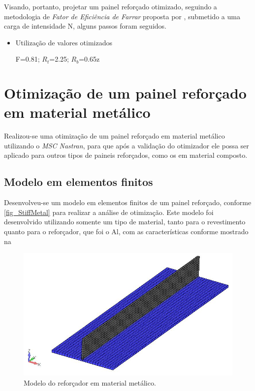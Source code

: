 {Visando, portanto, projetar um painel reforçado otimizado, seguindo a metodologia de \emph{Fator de Eficiência de Farrar} proposta por \cite{niu1997airframe}, submetido a uma carga de intensidade N, alguns passos foram seguidos.

\begin{itemize}
\item Utilização de valores otimizados \

F=0.81; $R_t$=2.25; $R_b$=0.65z\

\end{itemize}

\section{Otimização de um painel reforçado em material metálico}
Realizou-se uma otimização de um painel reforçado em material metálico utilizando o \emph{MSC Nastran}, para que após a validação do otimizador ele possa ser aplicado para outros tipos de paineis reforçados, como os em material composto.

\subsection{Modelo em elementos finitos}
Desenvolveu-se um modelo em elementos finitos de um painel reforçado, conforme \autoref{fig_StiffMetal} para realizar a análise de otimização. Este modelo foi desenvolvido utilizando somente um tipo de material, tanto para o revestimento quanto para o reforçador, que foi o Al, com as características conforme mostrado na %

\begin{figure}[ht]
	\caption{\label{fig_StiffMetal}Modelo do reforçador em material metálico.}
  \centering
  \includegraphics[scale=0.7]{figura/StiffMetal}
\end{figure}
\

}
